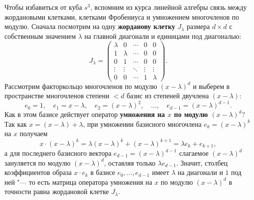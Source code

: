 Чтобы избавиться от куба $s^3$, вспомним из курса линейной алгебры связь между жордановыми клетками, клетками Фробениуса и умножением многочленов по модулю. Сначала посмотрим на одну \textbf{жорданову клетку} $J_\lambda$ размера $d \times d$ с собственным значением $\lambda$ на главной диагонали и единицами под диагональю:
\[
    J_\lambda = \begin{pmatrix}
        \lambda & 0 & \cdots & 0 & 0 \\
        1 & \lambda & \cdots & 0 & 0 \\
        0 & 1 & \cdots & 0 & 0 \\
        \vdots & \vdots & \ddots & \vdots & \vdots \\
        0 & 0 & \cdots & 1 & \lambda
    \end{pmatrix}.
\]
Рассмотрим факторкольцо многочленов по модулю $(x - \lambda)^d$ и выберем в пространстве многочленов степени $< d$ базис из степеней двучлена $(x - \lambda)$:
\[
    e_0 = 1, \quad e_1 = x - \lambda, \quad e_2 = (x - \lambda)^2, \quad \dots, \quad e_{d-1} = (x - \lambda)^{d-1}.
\]
Как в этом базисе действует оператор \textbf{умножения на $x$ по модулю $(x - \lambda)^d$}? Так как $x = (x - \lambda) + \lambda$, при умножении базисного многочлена $e_k = (x - \lambda)^k$ на $x$ получаем
\[
    x \cdot (x - \lambda)^k = \lambda (x - \lambda)^k + (x - \lambda)^{k+1} = \lambda e_k + e_{k+1},
\]
а для последнего базисного вектора $e_{d-1} = (x - \lambda)^{d-1}$ слагаемое $(x - \lambda)^d$ зануляется по модулю $(x - \lambda)^d$, оставляя только $\lambda e_{d-1}$. Значит, столбец коэффициентов образа $x \cdot e_k$ в базисе $e_0, \dots, e_{d-1}$ имеет $\lambda$ на диагонали и $1$ под ней "--- то есть матрица оператора умножения на $x$ по модулю $(x - \lambda)^d$ в точности равна жордановой клетке $J_\lambda$.

